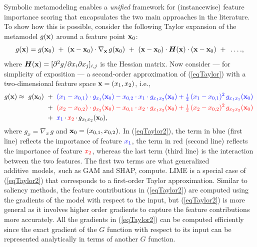 \documentclass [PhD] {uclathes}
\begin{document}
Symbolic metamodeling enables a {\it unified} framework for (instancewise) feature importance scoring that encapsulates the two main approaches in the literature. To show how this is possible, consider the following Taylor expansion of the metamodel $g({\bf x})$ around a feature point ${\bf x}_0$:   
\begin{equation}
g({\bf x}) = g({\bf x}_0) \,\, + \,\, ({\bf x} - {\bf x}_0) \cdot \nabla_{{\bf x}}\, g({\bf x}_0) \,\, + \,\, ({\bf x} - {\bf x}_0) \cdot \boldsymbol{H}({\bf x}) \cdot ({\bf x} - {\bf x}_0) \,\, + \,\,\,.\,.\,.\,.,
\label{eqTaylor}
\end{equation}
where $\boldsymbol{H}({\bf x}) = [\partial^2 g/\partial x_i \partial x_j]_{i,j}$ is the Hessian matrix. Now consider --- for simplicity of exposition --- a second-order approximation of (\ref{eqTaylor}) with a two-dimensional feature space ${\bf x} = (x_1,x_2)$, i.e.,
\begin{align}
g({\bf x}) \approx \,\, g({\bf x}_0) \,\,&+\,\,\color{blue}{(x_1-x_{0,1})\cdot g_{x_1}({\bf x}_0) - x_{0,2}\cdot x_1 \cdot g_{x_1x_2}({\bf x}_0) + \mbox{\footnotesize $\frac{1}{2}$}\,(x_1-x_{0,1})^2\,g_{x_1x_1}({\bf x}_0)}\,\,  \nonumber \\ 
&+\,\,\color{red}{(x_2-x_{0,2})\cdot g_{x_2}({\bf x}_0) - x_{0,1} \cdot x_2 \cdot g_{x_1x_2}({\bf x}_0) + \mbox{\footnotesize $\frac{1}{2}$}\,(x_2-x_{0,2})^2\,g_{x_2x_2}({\bf x}_0)} \nonumber \\ 
&+\,\,\color{blue}{x_1}\,\color{black}{\cdot}\,\color{red}{x_2}\,\color{black}{\cdot}\,\color{black}{g_{x_1x_2}({\bf x}_0),}
\label{eqTaylor2}
\end{align}
where $g_x = \nabla_x\, g$ and ${\bf x}_0 = (x_{0,1},x_{0,2})$. In (\ref{eqTaylor2}), the term in blue (first line) reflects the importance of feature $\color{blue}{x_1}$, the term in red (second line) reflects the importance of feature $\color{red}{x_2}$, whereas the last term (third line) is the interaction between the two features. The first two terms are what generalized additive~models,~such as GAM and SHAP, compute. LIME is a special case of (\ref{eqTaylor2}) that corresponds to a first-order Taylor approximation. Similar to saliency methods, the feature contributions in (\ref{eqTaylor2}) are computed using the gradients of the model with respect to the input, but (\ref{eqTaylor2}) is more general as it involves higher order gradients to capture the feature contributions more accurately. All the gradients in (\ref{eqTaylor2}) can be computed efficiently since the exact gradient of the $G$ function with respect to its input can be represented analytically in terms of another $G$ function.
\end{document}
